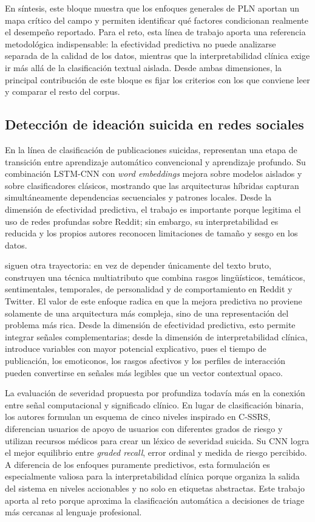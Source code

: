 En síntesis, este bloque muestra que los enfoques generales de PLN aportan un mapa crítico del campo y permiten identificar qué factores condicionan realmente el desempeño reportado. Para el reto, esta línea de trabajo aporta una referencia metodológica indispensable: la efectividad predictiva no puede analizarse separada de la calidad de los datos, mientras que la interpretabilidad clínica exige ir más allá de la clasificación textual aislada. Desde ambas dimensiones, la principal contribución de este bloque es fijar los criterios con los que conviene leer y comparar el resto del corpus.

\subsection{Detección de ideación suicida en redes sociales}

En la línea de clasificación de publicaciones suicidas, \citet{tadesse2020suicide} representan una etapa de transición entre aprendizaje automático convencional y aprendizaje profundo. Su combinación LSTM-CNN con \textit{word embeddings} mejora sobre modelos aislados y sobre clasificadores clásicos, mostrando que las arquitecturas híbridas capturan simultáneamente dependencias secuenciales y patrones locales. Desde la dimensión de efectividad predictiva, el trabajo es importante porque legitima el uso de redes profundas sobre Reddit; sin embargo, su interpretabilidad es reducida y los propios autores reconocen limitaciones de tamaño y sesgo en los datos.

\citet{chatterjee2022multimodal} siguen otra trayectoria: en vez de depender únicamente del texto bruto, construyen una técnica multiatributo que combina rasgos lingüísticos, temáticos, sentimentales, temporales, de personalidad y de comportamiento en Reddit y Twitter. El valor de este enfoque radica en que la mejora predictiva no proviene solamente de una arquitectura más compleja, sino de una representación del problema más rica. Desde la dimensión de efectividad predictiva, esto permite integrar señales complementarias; desde la dimensión de interpretabilidad clínica, introduce variables con mayor potencial explicativo, pues el tiempo de publicación, los emoticonos, los rasgos afectivos y los perfiles de interacción pueden convertirse en señales más legibles que un vector contextual opaco.

La evaluación de severidad propuesta por \citet{gaur2019severity} profundiza todavía más en la conexión entre señal computacional y significado clínico. En lugar de clasificación binaria, los autores formulan un esquema de cinco niveles inspirado en C-SSRS, diferencian usuarios de apoyo de usuarios con diferentes grados de riesgo y utilizan recursos médicos para crear un léxico de severidad suicida. Su CNN logra el mejor equilibrio entre \textit{graded recall}, error ordinal y medida de riesgo percibido. A diferencia de los enfoques puramente predictivos, esta formulación es especialmente valiosa para la interpretabilidad clínica porque organiza la salida del sistema en niveles accionables y no solo en etiquetas abstractas. Este trabajo aporta al reto porque aproxima la clasificación automática a decisiones de triage más cercanas al lenguaje profesional.

